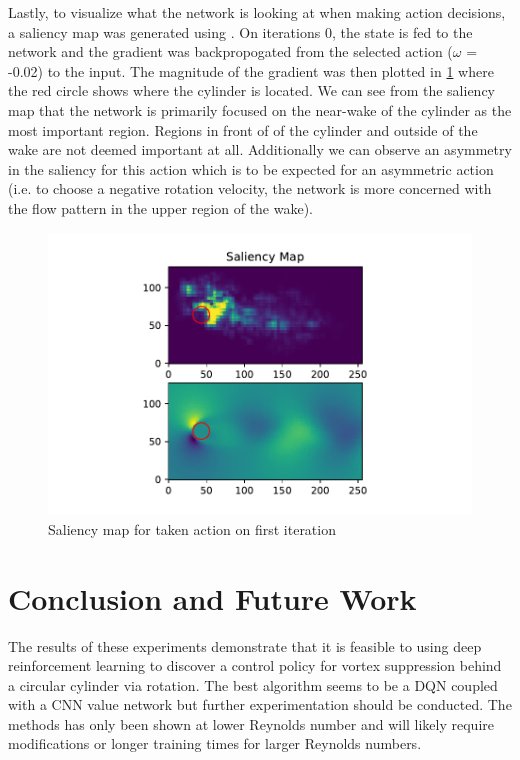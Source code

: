 \documentclass{article}
\begin{document}
Lastly, to visualize what the network is looking at when making action decisions, a saliency map was generated using \cite{saliency}. On iterations 0, the state is fed to the network and the gradient was backpropogated from the selected action ($\omega$ = -0.02) to the input. The magnitude of the gradient was then plotted in \cref{fig:saliency} where the red circle shows where the cylinder is located. We can see from the saliency map that the network is primarily focused on the near-wake of the cylinder as the most important region. Regions in front of of the cylinder and outside of the wake are not deemed important at all. Additionally we can observe an asymmetry in the saliency for this action which is to be expected for an asymmetric action (i.e. to choose a negative rotation velocity, the network is more concerned with the flow pattern in the upper region of the wake). 
\begin{figure}
\centering
  \includegraphics[scale=0.7]{saliency_map}
  \caption{Saliency map for taken action on first iteration}
  \label{fig:saliency}
\end{figure}

\section{Conclusion and Future Work}
\label{sec:conclusion}

The results of these experiments demonstrate that it is feasible to using deep reinforcement learning to discover a control policy for vortex suppression behind a circular cylinder via rotation. The best algorithm seems to be a DQN coupled with a CNN value network but further experimentation should be conducted. The methods has only been shown at lower Reynolds number and will likely require modifications or longer training times for larger Reynolds numbers. 
\end{document}
